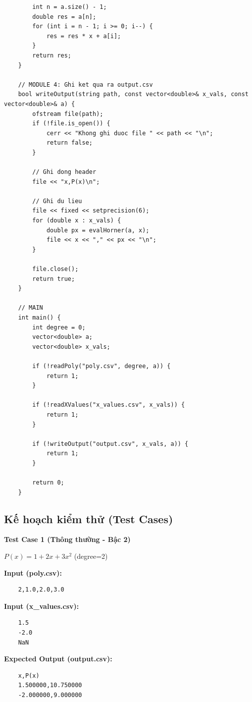 \begin{lstlisting}
        int n = a.size() - 1;
        double res = a[n];
        for (int i = n - 1; i >= 0; i--) {
            res = res * x + a[i];
        }
        return res;
    }

    // MODULE 4: Ghi ket qua ra output.csv
    bool writeOutput(string path, const vector<double>& x_vals, const vector<double>& a) {
        ofstream file(path);
        if (!file.is_open()) {
            cerr << "Khong ghi duoc file " << path << "\n";
            return false;
        }

        // Ghi dong header
        file << "x,P(x)\n";

        // Ghi du lieu
        file << fixed << setprecision(6);
        for (double x : x_vals) {
            double px = evalHorner(a, x);
            file << x << "," << px << "\n";
        }

        file.close();
        return true;
    }

    // MAIN
    int main() {
        int degree = 0;
        vector<double> a;
        vector<double> x_vals;

        if (!readPoly("poly.csv", degree, a)) {
            return 1;
        }

        if (!readXValues("x_values.csv", x_vals)) {
            return 1;
        }

        if (!writeOutput("output.csv", x_vals, a)) {
            return 1;
        }

        return 0;
    }
    \end{lstlisting}

\subsection{Kế hoạch kiểm thử (Test Cases)}

    \textbf{Test Case 1 (Thông thường - Bậc 2)}
    
    $P(x) = 1 + 2x + 3x^2$ (degree=2)
    
    \textbf{Input (poly.csv):}
    \begin{lstlisting}
    2,1.0,2.0,3.0\end{lstlisting}
    \textbf{Input (x\_values.csv):}
    \begin{lstlisting}
    1.5
    -2.0
    NaN\end{lstlisting}
    \textbf{Expected Output (output.csv):}
    \begin{lstlisting}
    x,P(x)
    1.500000,10.750000
    -2.000000,9.000000\end{lstlisting}

